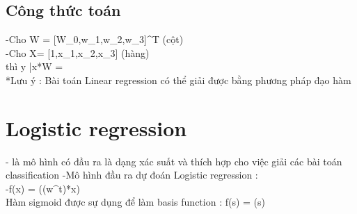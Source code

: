 \documentclass{article}
\begin{document}
 \subsection{Công thức toán}
-Cho W = [W_0,w_{1},w_{2},w_{3}]^T (cột)\\
-Cho X= [1,x_{1},x_{2},x_{3}] (hàng)  \\
thì y \approx \bar{x}*W =   \\
*Lưu ý : Bài toán Linear regression có thể giải được bằng phương pháp đạo hàm \\ 
\section{Logistic regression}
- là  mô hình có đầu ra là dạng xác suất  và thích hợp cho việc giải các bài toán classification 
-Mô hình đầu ra dự đoán Logistic regression : \\
-f(x) = \theta((w^t)*x) \\
Hàm sigmoid được sự dụng để làm basis function  : 
 f(s) =  \triangleq \sigma(s)
\end{document}

